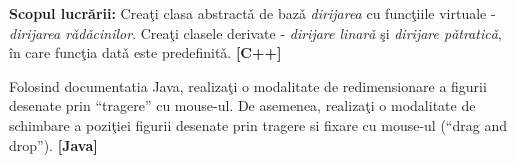 \textbf{Scopul lucr\u{a}rii:} Crea\c{t}i clasa abstract\v{a} de baz\v{a} \emph{dirijarea} cu func\c{t}iile
virtuale - \emph{dirijarea r\v{a}d\v{a}cinilor}. Crea\c{t}i clasele derivate - \emph{dirijare linar\v{a}} \c{s}i \emph{dirijare p\v{a}tratic\v{a}}, \^{i}n care func\c{t}ia dat\v{a} este predefinit\v{a}. \textbf{[C++]}

Folosind documentatia Java, realiza\c{t}i o modalitate de redimensionare a figurii desenate prin 
“tragere” cu mouse-ul. De asemenea, realiza\c{t}i o modalitate de schimbare a pozi\c{t}iei figurii 
desenate prin tragere si fixare cu mouse-ul (“drag and drop”). \textbf{[Java]}


 

